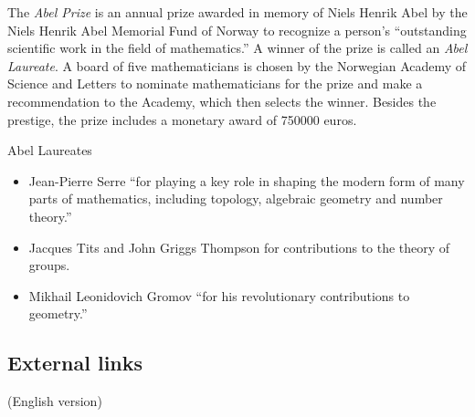 \documentclass[12pt]{article}
\begin{document}
The {\em Abel Prize} is an annual prize awarded in memory of  Niels Henrik Abel by the Niels Henrik Abel Memorial Fund of Norway to recognize a person's ``outstanding scientific work in the field of mathematics.'' A winner of the prize is called an {\em Abel Laureate}.  A board of five mathematicians is chosen by the Norwegian Academy of Science and Letters to nominate mathematicians for the prize and make a recommendation to the Academy, which then selects the winner. Besides the prestige, the prize includes a monetary award of 750000 euros.

Abel Laureates
\begin{itemize}
\item Jean-Pierre Serre ``for playing a key role in shaping the modern form of many parts of mathematics, including topology, algebraic geometry and number theory.'' 
\item Jacques Tits and John Griggs Thompson for contributions to the theory of groups.
\item Mikhail Leonidovich Gromov ``for his revolutionary contributions to geometry.''
\end{itemize}
\subsection{External links}
 (English version)
\end{document}

